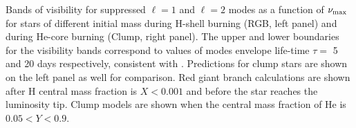 \label{fig:visibility} Bands of visibility for suppressed $\ell=1$ and $\ell=2$ modes as a function of $\nu_{\rm max}$ for stars of different initial mass during H-shell burning (RGB, left panel) and during He-core burning (Clump, right panel). The upper and lower boundaries for the visibility bands correspond to values of modes envelope life-time $\tau=$ 5 and 20 days respectively, consistent with \cite{Dupret_2009,Corsaro_2015}. Predictions for clump stars are shown on the left panel as well for comparison. Red giant branch calculations are shown after H central mass fraction is $ X < 0.001$ and before the star reaches the luminosity tip. Clump models are shown when the central mass fraction of He is $0.05 < Y < 0.9$.

  
  
  
  
  